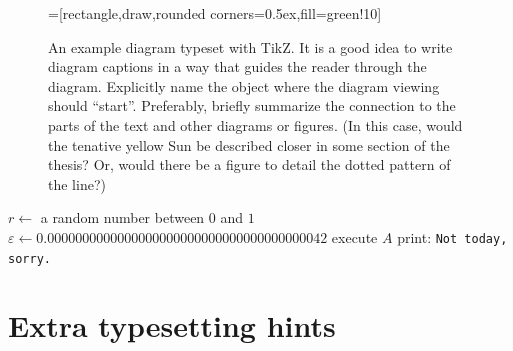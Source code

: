 \begin{figure}
\centering
{}=[rectangle,draw,rounded corners=0.5ex,fill=green!10]
\caption{An example diagram typeset with TikZ. It is a good idea to write diagram captions in a way that guides the reader through the diagram. Explicitly name the object where the diagram viewing should ``start''. Preferably, briefly summarize the connection to the parts of the text and other diagrams or figures. (In this case, would the tenative yellow Sun be described closer in some section of the thesis? Or, would there be a figure to detail the dotted pattern of the line?)}
\label{fig:schema}
\end{figure}

\begin{algorithm}
\begin{algorithmic}
  \State $r \gets$ a random number between $0$ and $1$
  \State $\varepsilon \gets 0.0000000000000000000000000000000000000042$
    \State execute $A$ 
  \Else
    \State print: \texttt{Not today, sorry.}
  \EndIf
\EndFunction
\end{algorithmic}
\caption{Algorithm that executes an action with high probability. Do not care about formal semantics in the pseudocode --- semicolons, types, correct function call parameters and similar nonsense from `realistic' languages can be safely omitted. Instead make sure that the intuition behind (and perhaps some hints about its correctness or various corner cases) can be seen as easily as possible.}
\label{alg:w}
\end{algorithm}

\section{Extra typesetting hints}

